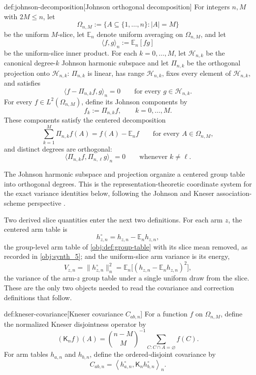 \documentclass[11pt]{article}
\begin{document}
\begin{definitionv}{def:johnson-decomposition}[Johnson orthogonal decomposition]
For integers \(n,M\) with \(2M\le n\), let
\[
\Omega_{n,M}:=\{A\subseteq \{1,\ldots,n\}: |A|=M\}
\]
be the uniform \(M\)-slice, let \(\mathbb E_n\) denote uniform averaging on \(\Omega_{n,M}\), and let
\[
\langle f,g\rangle_n:=\mathbb E_n[fg]
\]
be the uniform-slice inner product. For each \(k=0,\ldots,M\), let \(\mathcal H_{n,k}\) be the canonical degree-\(k\) Johnson harmonic subspace and let \(\Pi_{n,k}\) be the orthogonal projection onto \(\mathcal H_{n,k}\): \(\Pi_{n,k}\) is linear, has range \(\mathcal H_{n,k}\), fixes every element of \(\mathcal H_{n,k}\), and satisfies
\[
\langle f-\Pi_{n,k}f,g\rangle_n=0
\qquad
\text{for every }g\in\mathcal H_{n,k}.
\]
For every \(f\in L^2(\Omega_{n,M})\), define its Johnson components by
\[
f_k:=\Pi_{n,k}f,\qquad k=0,\ldots,M .
\]
These components satisfy the centered decomposition
\[
\sum_{k=1}^M \Pi_{n,k}f(A)=f(A)-\mathbb E_n f
\qquad\text{for every }A\in\Omega_{n,M},
\]
and distinct degrees are orthogonal:
\[
\langle \Pi_{n,k}f,\Pi_{n,\ell}g\rangle_n=0
\qquad\text{whenever }k\ne \ell .
\]
\end{definitionv}

The Johnson harmonic subspace  and projection  organize a centered group table into orthogonal degrees. This is the representation-theoretic coordinate system for the exact variance identities below, following the Johnson and Kneser association-scheme perspective \citep{Filmus2016,BrouwerEtAl2018}.

Two derived slice quantities enter the next two definitions. For each arm \(z\), the centered arm table is
\[
h_{z,n}^{\circ}=h_{z,n}-\mathbb E_n h_{z,n},
\]
the group-level arm table of \cref{obj:def:group-table} with its slice mean removed, as recorded in \cref{obj:synth_5}; and the uniform-slice arm variance is its energy,
\[
V_{z,n}=\|h_{z,n}^{\circ}\|_n^2=\mathbb E_n\bigl[(h_{z,n}-\mathbb E_n h_{z,n})^2\bigr],
\]
the variance of the arm-\(z\) group table under a single uniform draw from the slice. These are the only two objects needed to read the covariance and correction definitions that follow.

\begin{definitionv}{def:kneser-covariance}[Kneser covariance \(C_{ab,n}\)]
For a function \(f\) on \(\Omega_{n,M}\), define the normalized Kneser disjointness operator by
\[
(\mathsf K_n f)(A)
=
\binom{n-M}{M}^{-1}
\sum_{C:C\cap A=\varnothing} f(C).
\]
For arm tables \(h_{a,n}\) and \(h_{b,n}\), define the ordered-disjoint covariance by
\[
C_{ab,n}
=
\left\langle h_{a,n}^{\circ},\mathsf K_n h_{b,n}^{\circ}\right\rangle_n .
\]
\end{definitionv}
\end{document}
